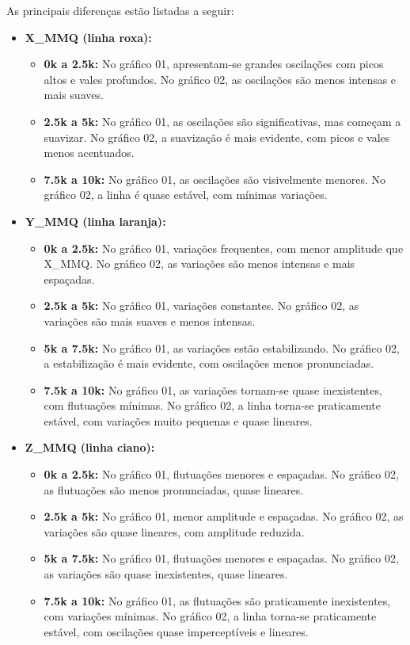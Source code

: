\documentclass[12pt, a4paper]{article}
\begin{document}
    As principais diferenças estão listadas a seguir:
    \begin{itemize}
        \item \textbf{X\_MMQ (linha roxa):}
              \begin{itemize}
                  \item \textbf{0k a 2.5k: }No gráfico 01, apresentam-se grandes oscilações com picos altos e vales profundos. No gráfico 02, as oscilações são menos intensas e mais suaves.
                  \item \textbf{2.5k a 5k: }No gráfico 01, as oscilações são significativas, mas começam a suavizar. No gráfico 02, a suavização é mais evidente, com picos e vales menos acentuados.
                  \item \textbf{7.5k a 10k:} No gráfico 01, as oscilações são visivelmente menores. No gráfico 02, a linha é quase estável, com mínimas variações.
              \end{itemize}
        \item \textbf{Y\_MMQ (linha laranja):}
              \begin{itemize}
                  \item \textbf{0k a 2.5k:} No gráfico 01, variações frequentes, com menor amplitude que X\_MMQ. No gráfico 02, as variações são menos intensas e mais espaçadas.
                  \item \textbf{2.5k a 5k:} No gráfico 01, variações constantes. No gráfico 02, as variações são mais suaves e menos intensas.
                  \item \textbf{5k a 7.5k:} No gráfico 01, as variações estão estabilizando. No gráfico 02, a estabilização é mais evidente, com oscilações menos pronunciadas.
                  \item \textbf{7.5k a 10k:} No gráfico 01, as variações tornam-se quase inexistentes, com flutuações mínimas. No gráfico 02, a linha torna-se praticamente estável, com variações muito pequenas e quase lineares.
              \end{itemize}
        \item \textbf{Z\_MMQ (linha ciano):}
              \begin{itemize}
                  \item \textbf{0k a 2.5k:} No gráfico 01, flutuações menores e espaçadas. No gráfico 02, as flutuações são menos pronunciadas, quase lineares.
                  \item \textbf{2.5k a 5k:} No gráfico 01, menor amplitude e espaçadas. No gráfico 02, as variações são quase lineares, com amplitude reduzida.
                  \item \textbf{5k a 7.5k:} No gráfico 01, flutuações menores e espaçadas. No gráfico 02, as variações são quase inexistentes, quase lineares.
                  \item \textbf{7.5k a 10k:} No gráfico 01, as flutuações são praticamente inexistentes, com variações mínimas. No gráfico 02, a linha torna-se praticamente estável, com oscilações quase imperceptíveis e lineares.
              \end{itemize}
    \end{itemize}
    
    \newpage
    
    
\end{document}
